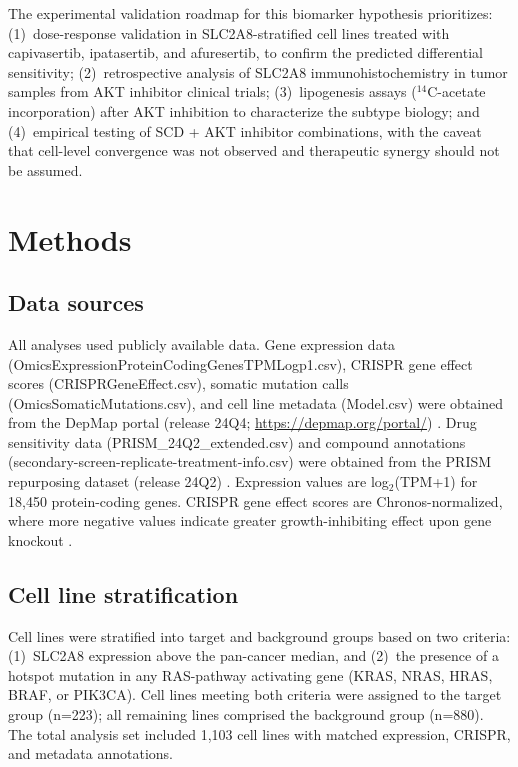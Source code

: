 \documentclass[12pt]{article}
\begin{document}
The experimental validation roadmap for this biomarker hypothesis
prioritizes: (1)~dose-response validation in SLC2A8-stratified cell
lines treated with capivasertib, ipatasertib, and afuresertib, to
confirm the predicted differential sensitivity; (2)~retrospective
analysis of SLC2A8 immunohistochemistry in tumor samples from AKT
inhibitor clinical trials; (3)~lipogenesis assays
($^{14}$C-acetate incorporation) after AKT inhibition to characterize
the subtype biology; and (4)~empirical testing of SCD + AKT inhibitor
combinations, with the caveat that cell-level convergence was not
observed and therapeutic synergy should not be assumed.

\section{Methods}

\subsection{Data sources}

All analyses used publicly available data. Gene expression data
(OmicsExpressionProteinCodingGenesTPMLogp1.csv), CRISPR gene effect
scores (CRISPRGeneEffect.csv), somatic mutation calls
(OmicsSomaticMutations.csv), and cell line metadata (Model.csv) were
obtained from the DepMap portal (release 24Q4;
\url{https://depmap.org/portal/}) \citep{Tsherniak2017}. Drug
sensitivity data (PRISM\_24Q2\_extended.csv) and compound annotations
(secondary-screen-replicate-treatment-info.csv) were obtained from the
PRISM repurposing dataset (release 24Q2) \citep{Corsello2020}.
Expression values are log$_2$(TPM+1) for 18,450 protein-coding genes.
CRISPR gene effect scores are Chronos-normalized, where more negative
values indicate greater growth-inhibiting effect upon gene knockout
\citep{Dempster2021}.

\subsection{Cell line stratification}

Cell lines were stratified into target and background groups based on
two criteria: (1)~SLC2A8 expression above the pan-cancer median, and
(2)~the presence of a hotspot mutation in any RAS-pathway activating
gene (KRAS, NRAS, HRAS, BRAF, or PIK3CA). Cell lines meeting both criteria were
assigned to the target group (n=223); all remaining lines comprised
the background group (n=880). The total analysis set included 1,103
cell lines with matched expression, CRISPR, and metadata annotations.
\end{document}
